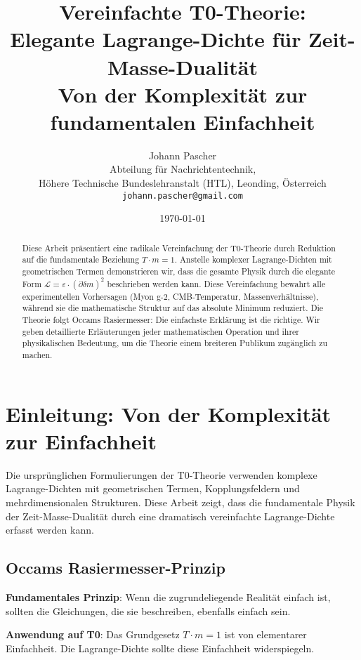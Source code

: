 \documentclass[12pt,a4paper]{article}
\title{Vereinfachte T0-Theorie: \\
	Elegante Lagrange-Dichte für Zeit-Masse-Dualität \\
	\large Von der Komplexität zur fundamentalen Einfachheit}
\author{Johann Pascher\\
	Abteilung für Nachrichtentechnik, \\Höhere Technische Bundeslehranstalt (HTL), Leonding, Österreich\\
	\texttt{johann.pascher@gmail.com}}
\date{\today}
\newcommand{\deltam}{\delta m}
\newcommand{\Lag}{\mathcal{L}}
\theoremstyle{definition}
\theoremstyle{remark}
\begin{document}
	
	\maketitle
	
	\begin{abstract}
		Diese Arbeit präsentiert eine radikale Vereinfachung der T0-Theorie durch Reduktion auf die fundamentale Beziehung $T \cdot m = 1$. Anstelle komplexer Lagrange-Dichten mit geometrischen Termen demonstrieren wir, dass die gesamte Physik durch die elegante Form $\Lag = \varepsilon \cdot (\partial \deltam)^2$ beschrieben werden kann. Diese Vereinfachung bewahrt alle experimentellen Vorhersagen (Myon g-2, CMB-Temperatur, Massenverhältnisse), während sie die mathematische Struktur auf das absolute Minimum reduziert. Die Theorie folgt Occams Rasiermesser: Die einfachste Erklärung ist die richtige. Wir geben detaillierte Erläuterungen jeder mathematischen Operation und ihrer physikalischen Bedeutung, um die Theorie einem breiteren Publikum zugänglich zu machen.
	\end{abstract}
	
	\tableofcontents
	\newpage
	
	\section{Einleitung: Von der Komplexität zur Einfachheit}
	
	Die ursprünglichen Formulierungen der T0-Theorie verwenden komplexe Lagrange-Dichten mit geometrischen Termen, Kopplungsfeldern und mehrdimensionalen Strukturen. Diese Arbeit zeigt, dass die fundamentale Physik der Zeit-Masse-Dualität durch eine dramatisch vereinfachte Lagrange-Dichte erfasst werden kann.
	
	\subsection{Occams Rasiermesser-Prinzip}
	
	\begin{tcolorbox}[colback=blue!5!white,colframe=blue!75!black,title=Occams Rasiermesser in der Physik]
		\textbf{Fundamentales Prinzip}: Wenn die zugrundeliegende Realität einfach ist, sollten die Gleichungen, die sie beschreiben, ebenfalls einfach sein.
		
		\textbf{Anwendung auf T0}: Das Grundgesetz $T \cdot m = 1$ ist von elementarer Einfachheit. Die Lagrange-Dichte sollte diese Einfachheit widerspiegeln.
	\end{tcolorbox}
	
\end{document}
